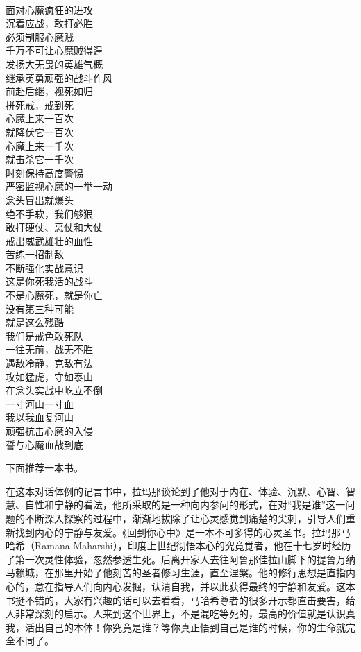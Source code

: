 \begin{poem}[戒色敢死队]
    \begin{multicols}{3}
        \centering~\\
        面对心魔疯狂的进攻 \\ 沉着应战，敢打必胜 \\ 必须制服心魔贼 \\ 千万不可让心魔贼得逞 \\ 发扬大无畏的英雄气概 \\ 继承英勇顽强的战斗作风 \\ 前赴后继，视死如归 \\ 拼死戒，戒到死 \\ 心魔上来一百次 \\ 就降伏它一百次 \\ 心魔上来一千次 \\ 就击杀它一千次 \\ 时刻保持高度警惕 \\ 严密监视心魔的一举一动 \\ 念头冒出就爆头 \\ 绝不手软，我们够狠 \\ 敢打硬仗、恶仗和大仗 \\ 戒出威武雄壮的血性 \\ 苦练一招制敌 \\ 不断强化实战意识 \\ 这是你死我活的战斗 \\ 不是心魔死，就是你亡 \\ 没有第三种可能 \\ 就是这么残酷 \\ 我们是戒色敢死队 \\ 一往无前，战无不胜 \\ 遇敌冷静，克敌有法 \\ 攻如猛虎，守如泰山 \\ 在念头实战中屹立不倒 \\ 一寸河山一寸血 \\ 我以我血复河山 \\ 顽强抗击心魔的入侵 \\ 誓与心魔血战到底
    \end{multicols}
\end{poem}

下面推荐一本书。

\begin{book}
    在这本对话体例的记言书中，拉玛那谈论到了他对于内在、体验、沉默、心智、智慧、自性和宁静的看法，他所采取的是一种向内参问的形式，在对“我是谁”这一问题的不断深入探察的过程中，渐渐地拔除了让心灵感觉到痛楚的尖刺，引导人们重新找到内心的宁静与友爱。《回到你心中》是一本不可多得的心灵圣书。拉玛那马哈希（Ramana Maharshi），印度上世纪彻悟本心的究竟觉者，他在十七岁时经历了第一次灵性体验，忽然参透生死。后离开家人去往阿鲁那佳拉山脚下的提鲁万纳马赖城，在那里开始了他刻苦的圣者修习生涯，直至涅槃。他的修行思想是直指内心的，意在指导人们向内心发掘，认清自我，并以此获得最终的宁静和友爱。这本书挺不错的，大家有兴趣的话可以去看看，马哈希尊者的很多开示都直击要害，给人非常深刻的启示。人来到这个世界上，不是混吃等死的，最高的价值就是认识真我，活出自己的本体！你究竟是谁？等你真正悟到自己是谁的时候，你的生命就完全不同了。
\end{book}
